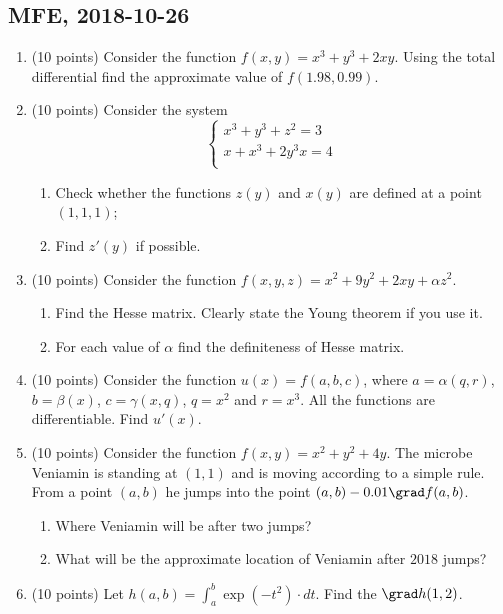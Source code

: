 
\subsection{MFE, 2018-10-26}

\begin{enumerate}
  \item (10 points) Consider the function $f(x, y) = x^3 + y^3 + 2xy$.
  Using the total differential find the approximate value of $f(1.98, 0.99)$.
  \item (10 points) Consider the system
  \[
  \begin{cases}
  x^3 + y^3 + z^2 = 3 \\
  x + x^3 + 2y^3x = 4 \\
  \end{cases}
  \]

  \begin{enumerate}
    \item Check whether the functions $z(y)$ and $x(y)$ are defined at a point $(1, 1, 1)$;
    \item Find $z'(y)$ if possible.
 \end{enumerate}
 \item (10 points) Consider the function $f(x, y, z) = x^2 + 9y^2 + 2xy + \alpha z^2$.
 \begin{enumerate}
   \item Find the Hesse matrix. Clearly state the Young theorem if you use it.
   \item For each value of $\alpha$ find the definiteness of Hesse matrix.
 \end{enumerate}
 \item (10 points) Consider the function $u(x)=f(a, b, c)$, where $a=\alpha(q,r)$, $b=\beta(x)$,
 $c=\gamma(x,q)$, $q=x^2$ and $r=x^3$. All the functions are differentiable.
 Find $u'(x)$.
  \item (10 points) Consider the function $f(x, y) = x^2 + y^2 + 4y$.
  The microbe Veniamin is standing at $(1,1)$ and is moving according to a simple rule.
  From a point $(a, b)$ he jumps into the point $(a, b) - 0.01\grad f(a,b)$.
  \begin{enumerate}
    \item Where Veniamin will be after two jumps?
    \item What will be the approximate location of Veniamin after $2018$ jumps?
  \end{enumerate}

  \item (10 points) Let $h(a, b) = \int_a^b \exp(-t^2) \cdot dt$. Find the $\grad h(1, 2)$.


\end{enumerate}
